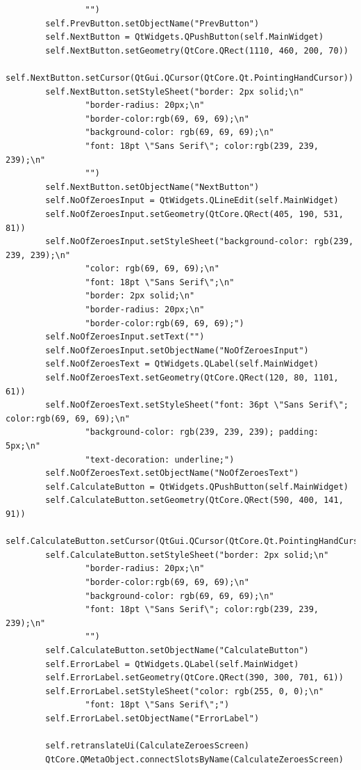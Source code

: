 \documentclass{article}
\begin{document}
\begin{lstlisting}
                "")
        self.PrevButton.setObjectName("PrevButton")
        self.NextButton = QtWidgets.QPushButton(self.MainWidget)
        self.NextButton.setGeometry(QtCore.QRect(1110, 460, 200, 70))
        self.NextButton.setCursor(QtGui.QCursor(QtCore.Qt.PointingHandCursor))
        self.NextButton.setStyleSheet("border: 2px solid;\n"
                "border-radius: 20px;\n"
                "border-color:rgb(69, 69, 69);\n"
                "background-color: rgb(69, 69, 69);\n"
                "font: 18pt \"Sans Serif\"; color:rgb(239, 239, 239);\n"
                "")
        self.NextButton.setObjectName("NextButton")
        self.NoOfZeroesInput = QtWidgets.QLineEdit(self.MainWidget)
        self.NoOfZeroesInput.setGeometry(QtCore.QRect(405, 190, 531, 81))
        self.NoOfZeroesInput.setStyleSheet("background-color: rgb(239, 239, 239);\n"
                "color: rgb(69, 69, 69);\n"
                "font: 18pt \"Sans Serif\";\n"
                "border: 2px solid;\n"
                "border-radius: 20px;\n"
                "border-color:rgb(69, 69, 69);")
        self.NoOfZeroesInput.setText("")
        self.NoOfZeroesInput.setObjectName("NoOfZeroesInput")
        self.NoOfZeroesText = QtWidgets.QLabel(self.MainWidget)
        self.NoOfZeroesText.setGeometry(QtCore.QRect(120, 80, 1101, 61))
        self.NoOfZeroesText.setStyleSheet("font: 36pt \"Sans Serif\"; color:rgb(69, 69, 69);\n"
                "background-color: rgb(239, 239, 239); padding: 5px;\n"
                "text-decoration: underline;")
        self.NoOfZeroesText.setObjectName("NoOfZeroesText")
        self.CalculateButton = QtWidgets.QPushButton(self.MainWidget)
        self.CalculateButton.setGeometry(QtCore.QRect(590, 400, 141, 91))
        self.CalculateButton.setCursor(QtGui.QCursor(QtCore.Qt.PointingHandCursor))
        self.CalculateButton.setStyleSheet("border: 2px solid;\n"
                "border-radius: 20px;\n"
                "border-color:rgb(69, 69, 69);\n"
                "background-color: rgb(69, 69, 69);\n"
                "font: 18pt \"Sans Serif\"; color:rgb(239, 239, 239);\n"
                "")
        self.CalculateButton.setObjectName("CalculateButton")
        self.ErrorLabel = QtWidgets.QLabel(self.MainWidget)
        self.ErrorLabel.setGeometry(QtCore.QRect(390, 300, 701, 61))
        self.ErrorLabel.setStyleSheet("color: rgb(255, 0, 0);\n"
                "font: 18pt \"Sans Serif\";")
        self.ErrorLabel.setObjectName("ErrorLabel")

        self.retranslateUi(CalculateZeroesScreen)
        QtCore.QMetaObject.connectSlotsByName(CalculateZeroesScreen)


\end{lstlisting}
\end{document}
